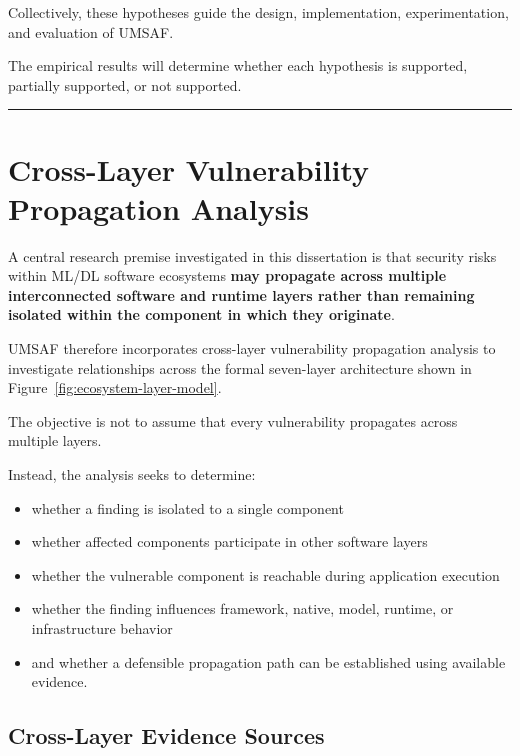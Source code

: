 \documentclass[
  12pt,
  letterpaper,
  oneside]{report}
\providecommand{\tightlist}{%
  \setlength{\itemsep}{0pt}\setlength{\parskip}{0pt}}
\begin{document}
Collectively, these hypotheses guide the design, implementation,
experimentation, and evaluation of UMSAF.

The empirical results will determine whether each hypothesis is
supported, partially supported, or not supported.

\begin{center}\rule{0.5\linewidth}{0.5pt}\end{center}

\section{Cross-Layer Vulnerability Propagation Analysis}\label{1112-cross-layer-vulnerability-propagation-analysis}

A central research premise investigated in this dissertation is that
security risks within ML/DL software ecosystems \textbf{may propagate
across multiple interconnected software and runtime layers rather than
remaining isolated within the component in which they originate}.

UMSAF therefore incorporates cross-layer vulnerability propagation
analysis to investigate relationships across the formal seven-layer
architecture shown in Figure~\ref{fig:ecosystem-layer-model}.

The objective is not to assume that every vulnerability propagates
across multiple layers.

Instead, the analysis seeks to determine:

\begin{itemize}
\tightlist
\item
  whether a finding is isolated to a single component
\item
  whether affected components participate in other software layers
\item
  whether the vulnerable component is reachable during application
  execution
\item
  whether the finding influences framework, native, model, runtime, or
  infrastructure behavior
\item
  and whether a defensible propagation path can be established using
  available evidence.
\end{itemize}

\subsection{Cross-Layer Evidence Sources}\label{11121-cross-layer-evidence-sources}
\end{document}
